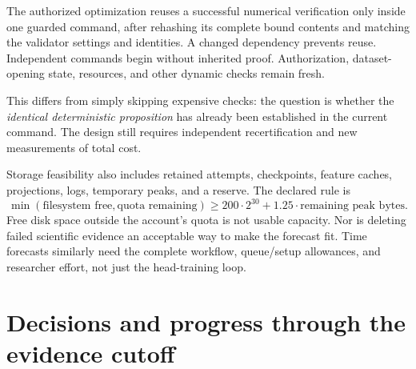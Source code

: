 The authorized optimization reuses a successful numerical verification only
inside one guarded command, after rehashing its complete bound contents and
matching the validator settings and identities. A changed dependency prevents
reuse. Independent commands begin without inherited proof. Authorization,
dataset-opening state, resources, and other dynamic checks remain fresh.

This differs from simply skipping expensive checks: the question is whether the
\emph{identical deterministic proposition} has already been established in the
current command. The design still requires independent recertification and new
measurements of total cost.

Storage feasibility also includes retained attempts, checkpoints, feature
caches, projections, logs, temporary peaks, and a reserve. The declared rule is
\[
 \min(\text{filesystem free},\text{quota remaining})
 \ge 200\cdot2^{30}+1.25\cdot\text{remaining peak bytes}.
\]
Free disk space outside the account's quota is not usable capacity. Nor is
deleting failed scientific evidence an acceptable way to make the forecast fit.
Time forecasts similarly need the complete workflow, queue/setup allowances,
and researcher effort, not just the head-training loop.


\section{Decisions and progress through the evidence cutoff}\label{sec:history}
